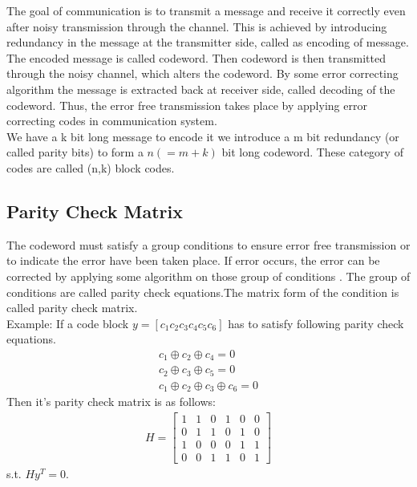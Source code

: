 



The goal of communication is to transmit a message and receive it correctly even after noisy transmission through the channel. This is achieved by introducing redundancy in the message at the transmitter side, called as encoding of message. The encoded message is called codeword. Then codeword is then transmitted through the noisy channel, which alters the codeword. By some error correcting algorithm the message is extracted back at receiver side, called decoding of the codeword. Thus, the error free transmission takes place by applying error correcting codes in communication system.\\
We have a k bit long message to encode it we introduce a m bit redundancy (or called parity bits) to form a $n(=m+k)$ bit long codeword. These category of codes are called (n,k) block codes. 

\subsection{Parity Check Matrix}

The codeword must satisfy a group conditions to ensure error free transmission or to indicate the error have been taken place. If error occurs, the error can be corrected by applying some algorithm on those group of conditions . The group of conditions are called parity check equations.The matrix form of the condition is called parity check matrix. \\
Example: If a code block $y=[c_1 c_2 c_3 c_4 c_5 c_6]$ has to satisfy following parity check equations. 
\begin{align}
c_1 \oplus c_2 \oplus c_4 =0 \\
 c_2 \oplus c_3 \oplus c_5 =0 \\
c_1 \oplus c_2 \oplus c_3 \oplus c_6 =0 
\end{align}  
Then it's parity check matrix is as follows:
\begin{align}
 H= \left[ \begin{array}{cccccc}
1 & 1 & 0 & 1 & 0 & 0\\
0 & 1 & 1 & 0 & 1 & 0\\
1 & 0 & 0 & 0 & 1 & 1\\
0 & 0 & 1 & 1 & 0 & 1  
\end{array} \right]  
\end{align} 
s.t. $Hy^T=0$.

